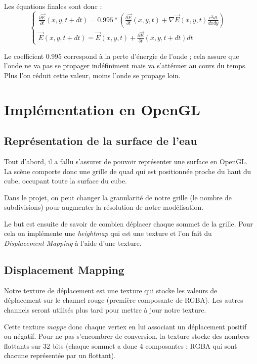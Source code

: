 \documentclass[a4paper,11pt,leqno]{article}
\begin{document}
Les équations finales sont donc :
\[
\begin{cases}
	\frac{\partial \overrightarrow{E}}{\partial t}(x, y, t+dt) = 0.995 * (\frac{\partial \overrightarrow{E}}{\partial t}(x, y, t) + \nabla \overrightarrow{E}(x, y, t) \frac{c^2dt}{dx dy}) \\
	
	\overrightarrow{E}(x,y,t+dt) = \overrightarrow{E}(x,y,t) + \frac{\partial \overrightarrow{E}}{\partial t}(x, y, t+dt)dt
\end{cases}
\]

Le coefficient $0.995$ correspond à la perte d'énergie de l'onde ; cela assure que l'onde ne va pas se propager indéfiniment mais va s'atténuer au cours du temps. Plus l'on réduit cette valeur, moins l'onde se propage loin.

\section{Implémentation en OpenGL}

\subsection{Représentation de la surface de l'eau}

Tout d'abord, il a fallu s'assurer de pouvoir représenter une surface en OpenGL. La scène comporte donc une grille de quad qui est positionnée proche du haut du cube, occupant toute la surface du cube.

Dans le projet, on peut changer la granularité de notre grille (le nombre de subdivisions) pour augmenter la résolution de notre modélisation.

Le but est ensuite de savoir de combien déplacer chaque sommet de la grille. Pour cela on implémente une \emph{heightmap} qui est une texture et l'on fait du \emph{Displacement Mapping} à l'aide d'une texture.

\subsection{Displacement Mapping}

Notre texture de déplacement est une texture qui stocke les valeurs de déplacement sur le channel rouge (première composante de RGBA). Les autres channels seront utilisés plus tard pour mettre à jour notre texture.

Cette texture \emph{mappe} donc chaque vertex en lui associant un déplacement positif ou négatif. Pour ne pas s'encombrer de conversion, la texture stocke des nombres flottants sur 32 bits (chaque sommet a donc 4 composantes : RGBA qui sont chacune représentée par un flottant).
\end{document}
